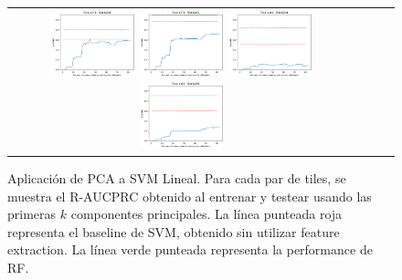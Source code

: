 \begin{figure}[h!]
\begin{tabular}{cccc}
\includegraphics[width=0.25\textwidth]{Kap5/linear_INDIVIDUAL_CURVES_train=b278test=b234.png}  \includegraphics[width=0.25\textwidth]{Kap5/linear_INDIVIDUAL_CURVES_train=b278test=b261.png} 
 \includegraphics[width=0.25\textwidth]{Kap5/linear_INDIVIDUAL_CURVES_train=b360test=b234.png}  \includegraphics[width=0.25\textwidth]{Kap5/linear_INDIVIDUAL_CURVES_train=b360test=b278.png} 
\end{tabular}
\caption{Aplicación de PCA a SVM Lineal. Para cada par de tiles, se muestra el R-AUCPRC obtenido al entrenar y testear usando las primeras $k$ componentes principales. La línea punteada roja representa el baseline de SVM, obtenido sin utilizar feature extraction. La línea verde punteada representa la performance de RF.}
\label{fig:pca_l}
\end{figure}


